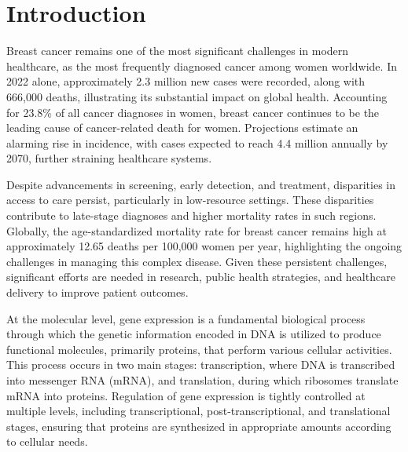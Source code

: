 \chapter{Introduction}

Breast cancer remains one of the most significant challenges in modern
healthcare, as the most frequently diagnosed cancer among women worldwide.
In 2022 alone, approximately 2.3 million new cases were recorded, along with
666,000 deaths, illustrating its substantial impact on global health.
Accounting for 23.8\% of all cancer diagnoses in
women\supercite{bray_global_2024,ferlay_global_2024}, breast cancer continues
to be the leading cause of cancer-related death for women.
Projections estimate an alarming rise in incidence, with cases expected to
reach 4.4 million annually by 2070, further straining healthcare
systems\supercite{lei_global_2021}.

Despite advancements in screening, early detection, and treatment, disparities
in access to care persist, particularly in low-resource settings.
These disparities contribute to late-stage diagnoses and higher mortality rates
in such regions\supercite{wilkinson_understanding_2022,ginsburg_breast_2020}.
Globally, the age-standardized mortality rate for breast cancer remains high at
approximately 12.65 deaths per 100,000 women per year, highlighting the ongoing
challenges in managing this complex
disease\supercite{bray_global_2024,ferlay_global_2024}.
Given these persistent challenges, significant efforts are needed in research,
public health strategies, and healthcare delivery to improve patient
outcomes\supercite{desantis_breast_2019}.

At the molecular level, gene expression is a fundamental biological process
through which the genetic information encoded in DNA is utilized to produce
functional molecules, primarily proteins, that perform various cellular
activities\supercite{salmena_cerna_2011}.
This process occurs in two main stages: transcription, where DNA is transcribed
into messenger RNA (mRNA), and translation, during which ribosomes translate
mRNA into proteins\supercite{salmena_cerna_2011,tay_multilayered_2014}.
Regulation of gene expression is tightly controlled at multiple levels,
including transcriptional, post-transcriptional, and translational stages,
ensuring that proteins are synthesized in appropriate amounts according to
cellular
needs\supercite{poliseno_coding-independent_2010,tay_multilayered_2014}.

